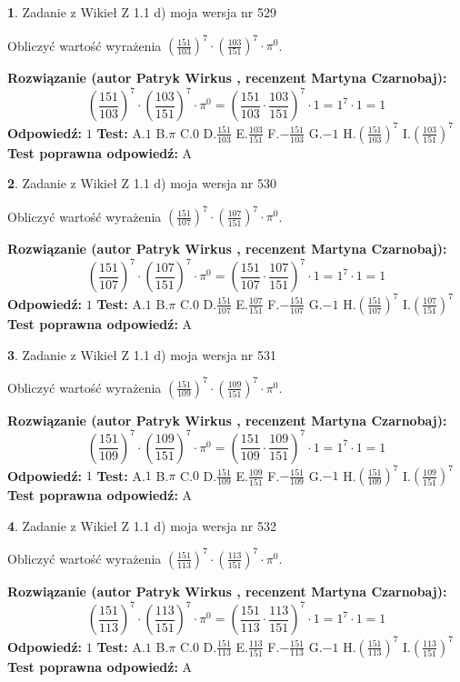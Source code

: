 \documentclass[12pt, a4paper]{article}
\theoremstyle{definition} %
\newtheorem{zad}{}
\newcommand{\zadStart}[1]{\begin{zad}#1\newline}
\newcommand{\zadStop}{\end{zad}}
\newcommand{\rozwStart}[2]{\noindent \textbf{Rozwiązanie (autor #1 , recenzent #2): }\newline}
\newcommand{\rozwStop}{\newline}
\newcommand{\odpStart}{\noindent \textbf{Odpowiedź:}\newline}
\newcommand{\odpStop}{\newline}
\newcommand{\testStart}{\noindent \textbf{Test:}\newline}
\newcommand{\testStop}{\newline}
\newcommand{\kluczStart}{\noindent \textbf{Test poprawna odpowiedź:}\newline}
\newcommand{\kluczStop}{\newline}
\begin{document}
\zadStart{Zadanie z Wikieł Z 1.1 d) moja wersja nr 529}

Obliczyć wartość wyrażenia $(\frac{151}{103})^{7} \cdot (\frac{103}{151})^{7} \cdot \pi^{0}$.
\zadStop
\rozwStart{Patryk Wirkus}{Martyna Czarnobaj}
$$(\frac{151}{103})^{7} \cdot (\frac{103}{151})^{7} \cdot \pi^{0} = (\frac{151}{103} \cdot \frac{103}{151})^{7} \cdot 1 = 1^{7} \cdot 1 = 1$$
\rozwStop
\odpStart
$1$
\odpStop
\testStart
A.$1$ B.$\pi$ C.$0$ D.$\frac{151}{103}$ E.$\frac{103}{151}$
F.$-\frac{151}{103}$ G.$-1$
H.$(\frac{151}{103})^{7}$
I.$(\frac{103}{151})^{7}$
\testStop
\kluczStart
A
\kluczStop



\zadStart{Zadanie z Wikieł Z 1.1 d) moja wersja nr 530}

Obliczyć wartość wyrażenia $(\frac{151}{107})^{7} \cdot (\frac{107}{151})^{7} \cdot \pi^{0}$.
\zadStop
\rozwStart{Patryk Wirkus}{Martyna Czarnobaj}
$$(\frac{151}{107})^{7} \cdot (\frac{107}{151})^{7} \cdot \pi^{0} = (\frac{151}{107} \cdot \frac{107}{151})^{7} \cdot 1 = 1^{7} \cdot 1 = 1$$
\rozwStop
\odpStart
$1$
\odpStop
\testStart
A.$1$ B.$\pi$ C.$0$ D.$\frac{151}{107}$ E.$\frac{107}{151}$
F.$-\frac{151}{107}$ G.$-1$
H.$(\frac{151}{107})^{7}$
I.$(\frac{107}{151})^{7}$
\testStop
\kluczStart
A
\kluczStop



\zadStart{Zadanie z Wikieł Z 1.1 d) moja wersja nr 531}

Obliczyć wartość wyrażenia $(\frac{151}{109})^{7} \cdot (\frac{109}{151})^{7} \cdot \pi^{0}$.
\zadStop
\rozwStart{Patryk Wirkus}{Martyna Czarnobaj}
$$(\frac{151}{109})^{7} \cdot (\frac{109}{151})^{7} \cdot \pi^{0} = (\frac{151}{109} \cdot \frac{109}{151})^{7} \cdot 1 = 1^{7} \cdot 1 = 1$$
\rozwStop
\odpStart
$1$
\odpStop
\testStart
A.$1$ B.$\pi$ C.$0$ D.$\frac{151}{109}$ E.$\frac{109}{151}$
F.$-\frac{151}{109}$ G.$-1$
H.$(\frac{151}{109})^{7}$
I.$(\frac{109}{151})^{7}$
\testStop
\kluczStart
A
\kluczStop



\zadStart{Zadanie z Wikieł Z 1.1 d) moja wersja nr 532}

Obliczyć wartość wyrażenia $(\frac{151}{113})^{7} \cdot (\frac{113}{151})^{7} \cdot \pi^{0}$.
\zadStop
\rozwStart{Patryk Wirkus}{Martyna Czarnobaj}
$$(\frac{151}{113})^{7} \cdot (\frac{113}{151})^{7} \cdot \pi^{0} = (\frac{151}{113} \cdot \frac{113}{151})^{7} \cdot 1 = 1^{7} \cdot 1 = 1$$
\rozwStop
\odpStart
$1$
\odpStop
\testStart
A.$1$ B.$\pi$ C.$0$ D.$\frac{151}{113}$ E.$\frac{113}{151}$
F.$-\frac{151}{113}$ G.$-1$
H.$(\frac{151}{113})^{7}$
I.$(\frac{113}{151})^{7}$
\testStop
\kluczStart
A
\kluczStop
\end{document}
